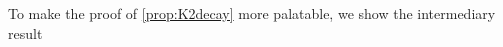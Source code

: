 \documentclass[
	fontsize=11pt, 
	twoside=false, 
	abstract=true, 
	a4paper,
]{scrartcl}
\newcommand{\sem}{\setminus\{0\}}
\newcommand{\RR}{\mathbb{R}}
\newcommand{\abs}[1]{\left\lvert#1\right\rvert}
\newcommand{\del}{\partial}
\newcommand{\supp}{\mathrm{supp}}
\newcommand{\an}{\quad\text{and}\quad}
\begin{document}
To make the proof of \cref{prop:K2decay} more palatable, we show the intermediary result
%
\end{document}
